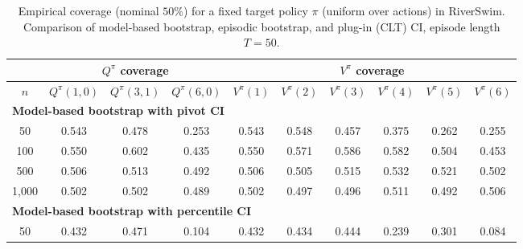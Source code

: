 \documentclass{article}
\numberwithin{equation}{section}
\begin{document}
\begin{table}[ht]
\centering
\caption{Empirical coverage (nominal $50\%$) for a fixed target policy $\pi$ (uniform over actions) in RiverSwim. Comparison of model-based bootstrap, episodic bootstrap, and plug-in (CLT) CI, episode length $T=50$.}
\label{tab:riverswim-uniform-coverage-50}
\begin{tabular}{c|ccc|cccccc}
\hline
& \multicolumn{3}{c|}{$Q^\pi$ coverage} & \multicolumn{6}{c}{$V^\pi$ coverage} \\ \hline
$n$
& $Q^\pi(1,0)$ & $Q^\pi(3,1)$ & $Q^\pi(6,0)$
& $V^\pi(1)$ & $V^\pi(2)$ & $V^\pi(3)$ & $V^\pi(4)$ & $V^\pi(5)$ & $V^\pi(6)$ \\
\hline
\multicolumn{10}{l}{\textbf{Model-based bootstrap with pivot CI}} \\ \hline
50
& \cellcolor{covheat!100!white}0.543 & \cellcolor{covheat!89!white}0.478 & 0.253
& \cellcolor{covheat!100!white}0.543 & \cellcolor{covheat!100!white}0.548 & \cellcolor{covheat!79!white}0.457 & \cellcolor{covheat!38!white}0.375 & 0.262 & 0.255 \\
100
& \cellcolor{covheat!100!white}0.550 & \cellcolor{covheat!100!white}0.602 & \cellcolor{covheat!68!white}0.435
& \cellcolor{covheat!100!white}0.550 & \cellcolor{covheat!100!white}0.571 & \cellcolor{covheat!100!white}0.586 & \cellcolor{covheat!100!white}0.582 & \cellcolor{covheat!100!white}0.504 & \cellcolor{covheat!77!white}0.453 \\
500
& \cellcolor{covheat!100!white}0.506 & \cellcolor{covheat!100!white}0.513 & \cellcolor{covheat!96!white}0.492
& \cellcolor{covheat!100!white}0.506 & \cellcolor{covheat!100!white}0.505 & \cellcolor{covheat!100!white}0.515 & \cellcolor{covheat!100!white}0.532 & \cellcolor{covheat!100!white}0.521 & \cellcolor{covheat!100!white}0.502 \\
1{,}000
& \cellcolor{covheat!100!white}0.502 & \cellcolor{covheat!100!white}0.502 & \cellcolor{covheat!94!white}0.489
& \cellcolor{covheat!100!white}0.502 & \cellcolor{covheat!98!white}0.497 & \cellcolor{covheat!98!white}0.496 & \cellcolor{covheat!100!white}0.511 & \cellcolor{covheat!96!white}0.492 & \cellcolor{covheat!100!white}0.506 \\
\hline
\multicolumn{10}{l}{\textbf{Model-based bootstrap with percentile CI}} \\ \hline
50
& \cellcolor{covheat!66!white}0.432 & \cellcolor{covheat!85!white}0.471 & 0.104
& \cellcolor{covheat!66!white}0.432 & \cellcolor{covheat!67!white}0.434 & \cellcolor{covheat!72!white}0.444 & 0.239 & \cellcolor{covheat!1!white}0.301 & 0.084 \\

\end{tabular}
\end{table}
\end{document}
